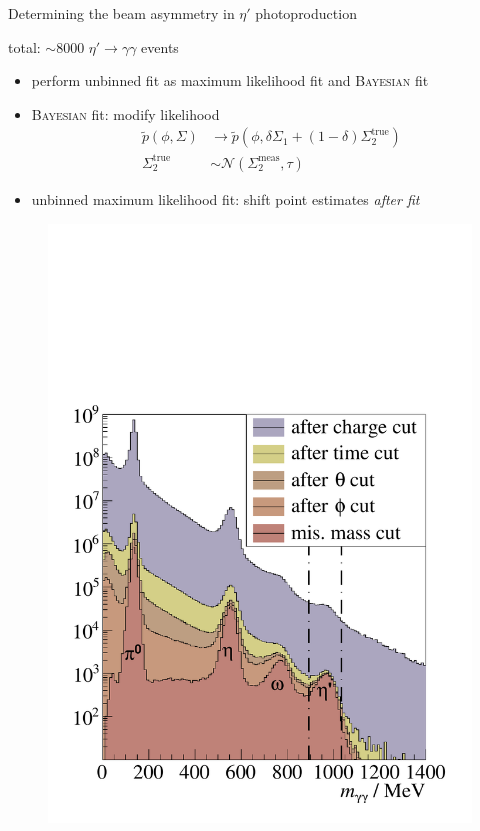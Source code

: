 \documentclass[11pt,aspectratio=169,dvipsnames]{beamer}
\begin{document}
	\begin{frame}{Determining the beam asymmetry in $\eta'$ photoproduction}
		
		
		\begin{minipage}{0.49\linewidth}
			total: $\sim 8000$ $\eta'\to\gamma\gamma$ events
			\begin{itemize}
				\item perform unbinned fit as maximum likelihood fit and \textsc{Bayesian} fit
				\item \textsc{Bayesian} fit: modify likelihood
					 \begin{align*}
					 	\tilde{p}\left(\phi,\Sigma\right)&\to\tilde{p}\left(\phi,\delta\Sigma_1+(1-\delta)\Sigma_2^\text{true}\right)\\
					 	\Sigma_2^\text{true}&\sim\mathcal{N}(\Sigma_2^\text{meas},\tau)
					 \end{align*}

			\item unbinned maximum likelihood fit: shift point estimates \emph{after fit}
			\end{itemize}
		\end{minipage}
		\begin{minipage}{.49\linewidth}
			\begin{figure}
				\centering
				\includegraphics[width=1.05\linewidth]{../../figs/hydrogen/inc_mass_pretty_talk.pdf}
			\end{figure}
		\end{minipage}
		
	\end{frame}
	
\end{document}
